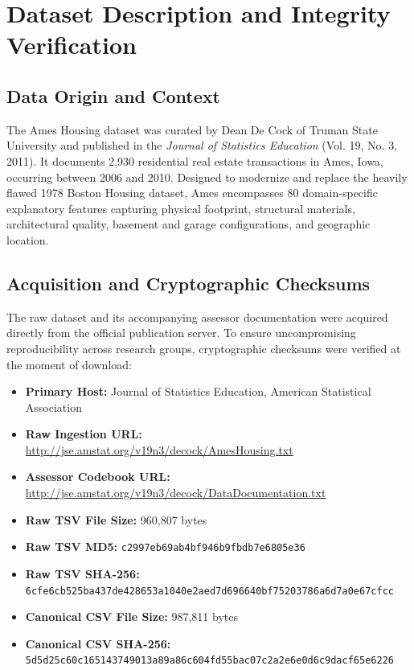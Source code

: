 \documentclass[11pt,a4paper]{article}
\begin{document}
\section{Dataset Description and Integrity Verification}

\subsection{Data Origin and Context}
The Ames Housing dataset was curated by Dean De Cock of Truman State University and published in the \textit{Journal of Statistics Education} (Vol. 19, No. 3, 2011). It documents 2,930 residential real estate transactions in Ames, Iowa, occurring between 2006 and 2010. Designed to modernize and replace the heavily flawed 1978 Boston Housing dataset, Ames encompasses 80 domain-specific explanatory features capturing physical footprint, structural materials, architectural quality, basement and garage configurations, and geographic location.

\subsection{Acquisition and Cryptographic Checksums}
The raw dataset and its accompanying assessor documentation were acquired directly from the official publication server. To ensure uncompromising reproducibility across research groups, cryptographic checksums were verified at the moment of download:
\begin{itemize}
    \item \textbf{Primary Host:} Journal of Statistics Education, American Statistical Association
    \item \textbf{Raw Ingestion URL:} \url{http://jse.amstat.org/v19n3/decock/AmesHousing.txt}
    \item \textbf{Assessor Codebook URL:} \url{http://jse.amstat.org/v19n3/decock/DataDocumentation.txt}
    \item \textbf{Raw TSV File Size:} 960,807 bytes
    \item \textbf{Raw TSV MD5:} {\footnotesize \texttt{c2997eb69ab4bf946b9fbdb7e6805e36}}
    \item \textbf{Raw TSV SHA-256:} {\scriptsize \texttt{6cfe6cb525ba437de428653a1040e2aed7d696640bf75203786a6d7a0e67cfcc}}
    \item \textbf{Canonical CSV File Size:} 987,811 bytes
    \item \textbf{Canonical CSV SHA-256:} {\scriptsize \texttt{5d5d25c60c165143749013a89a86c604fd55bac07c2a2e6e0d6c9dacf65e6226}}
\end{itemize}
\end{document}
